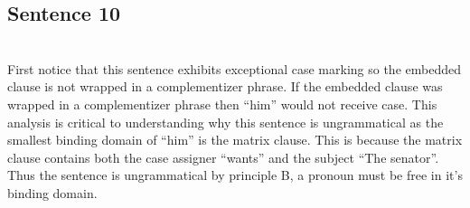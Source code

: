 \documentclass[20pt]{article}
\newcommand{\feature}[1]{\ensuremath{\left[ \text{#1} \right]}}
\newcommand{\treeScale}[0]{0.7}
\begin{document}
\subsection*{Sentence 10}
 \\

First notice that this sentence exhibits exceptional case marking so the embedded clause is not wrapped in a
complementizer phrase. If the embedded clause was wrapped in a complementizer
phrase then ``him'' would not receive case. This analysis is critical to
understanding why this sentence is ungrammatical as the smallest binding domain
of ``him'' is the matrix clause. This is because the matrix clause contains both
the case assigner ``wants'' and the subject ``The senator''. Thus the sentence
is ungrammatical by principle B, a pronoun must be free in it's binding domain.
\end{document}
